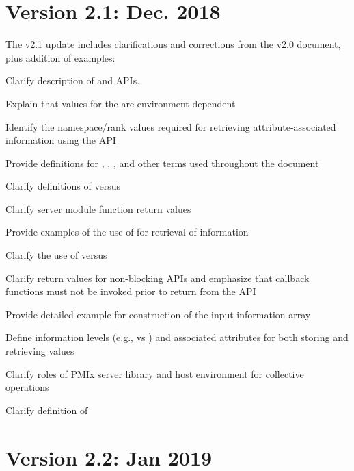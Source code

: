 \section{Version 2.1: Dec. 2018}

The v2.1 update includes clarifications and corrections from the v2.0 document, plus addition of examples:

\begin{compactitemize}
    \item Clarify description of  and  \acp{API}.
    \item Explain that values for the  are environment-dependent
    \item Identify the namespace/rank values required for retrieving attribute-associated information using the  \ac{API}
    \item Provide definitions for , , , and other terms used throughout the document
    \item Clarify definitions of  versus 
    \item Clarify server module function return values
    \item Provide examples of the use of  for retrieval of information
    \item Clarify the use of  versus 
    \item Clarify return values for non-blocking \acp{API} and emphasize that callback functions must not be invoked prior to return from the \ac{API}
    \item Provide detailed example for construction of the  input information array
    \item Define information levels (e.g.,  vs ) and associated attributes for both storing and retrieving values
    \item Clarify roles of \ac{PMIx} server library and host environment for collective operations
    \item Clarify definition of 
\end{compactitemize}


\section{Version 2.2: Jan 2019}

